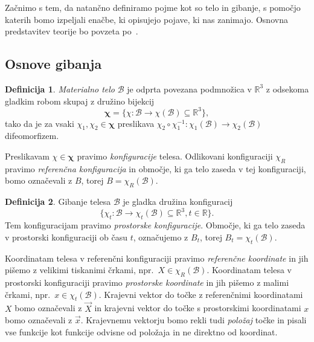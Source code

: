 \documentclass[12pt,a4paper,twoside]{article}
\theoremstyle{definition} %
\newtheorem{definicija}{Definicija}[section]
\theoremstyle{plain} %
\numberwithin{equation}{section}
\newcommand{\R}{\mathbb R}
\newcommand{\B}{\mathcal{B}}
\renewcommand{\b}{\boldsymbol}
\newcommand{\vX}{\vec{X}}
\newcommand{\vx}{\vec{x}}
\begin{document}
Začnimo s tem, da natančno definiramo pojme kot so telo in gibanje, s pomočjo katerih bomo izpeljali
enačbe, ki opisujejo pojave, ki nas zanimajo. Osnovna predstavitev teorije bo povzeta
po~\cite{slaughter2012linearized}.

\subsection{Osnove gibanja}

\begin{definicija}
  \emph{Materialno telo} $\B$ je odprta povezana podmnožica v $\R^3$ z odsekoma gladkim
  robom skupaj z družino bijekcij
  \begin{equation}
    \b\chi = \{\chi \colon\B\to\chi(\B) \subseteq \R^3\},
  \end{equation}
  tako da je za vsaki $\chi_1, \chi_2 \in \b\chi$ preslikava
  $\chi_2\circ\chi_1^{-1}\colon \chi_1(\B) \to \chi_2(\B)$
  difeomorfizem.

  Preslikavam $\chi \in \b\chi$ pravimo \emph{konfiguracije} telesa. Odlikovani
  konfiguraciji $\chi_R$ pravimo \emph{referenčna konfiguracija} in območje, ki
  ga telo zaseda v tej konfiguraciji, bomo označevali z $B$, torej $B =
  \chi_R(\B)$.
\end{definicija}

\begin{definicija}
  \label{def:gibanje}
  Gibanje telesa $\B$ je gladka družina konfiguracij
  \begin{equation}
    \{\chi_t\colon \B \to\chi_t(\B) \subseteq \R^3, t \in \R\}.
  \end{equation}
  Tem konfiguracijam pravimo \emph{prostorske konfiguracije}. Območje, ki ga
  telo zaseda v prostorski konfiguraciji ob času $t$, označujemo z $B_t$, torej
  $B_t = \chi_t(\B)$.
\end{definicija}
Koordinatam telesa v referenčni konfiguraciji pravimo \emph{referenčne koordinate} in jih pišemo z
velikimi tiskanimi črkami, npr.~$X \in \chi_R(\B)$. Koordinatam telesa v prostorski konfiguraciji
pravimo \emph{prostorske koordinate} in jih pišemo z malimi črkami, npr.~$x \in \chi_t(\B)$.
Krajevni vektor do točke z referenčnimi koordinatami $X$ bomo označevali z $\vX$ in krajevni vektor
do točke s prostorskimi koordinatami $x$ bomo označevali z $\vx$. Krajevnemu vektorju bomo rekli
tudi \emph{položaj} točke in pisali vse funkcije kot funkcije odvisne od položaja in ne direktno od
koordinat.
\end{document}
